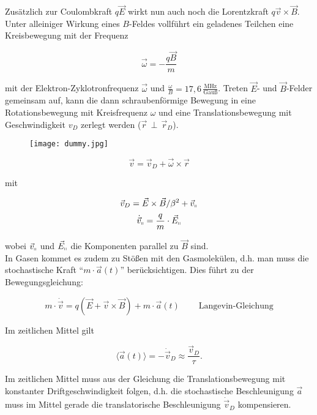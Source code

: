 Zusätzlich zur Coulombkraft $q\vec{E}$ wirkt nun auch noch die Lorentzkraft $q\vec{v}\times
\vec{B}$. Unter alleiniger Wirkung eines $B$-Feldes vollführt ein geladenes Teilchen eine
Kreisbewegung mit der Frequenz

\[\vec{\omega} = -\frac{q\vec{B}}{m}\]

mit der Elektron-Zyklotronfrequenz $\vec{\omega}$ und
$\frac{\omega}{B}=17{,}6\,\frac{\text{MHz}}{\text{Gauß}}$. Treten $\vec{E}$- und $\vec{B}$-Felder
gemeinsam auf, kann die dann schraubenförmige Bewegung in eine Rotationsbewegung mit Kreisfrequenz
$\omega$ und eine Translationsbewegung mit Geschwindigkeit $v_D$ zerlegt werden
($\vec{r}\,\perp\,\vec{r}_D$). 

\begin{figure}[H]
	\centering
	\texttt{[image: dummy.jpg]}
\end{figure}

\[ \vec{v}= \vec{v}_D + \vec{\omega}\times\vec{r} \]
 
 mit
 
 \[\vec{v}_D=\vec{E}\times \vec{B}/\beta^2 +\vec{v}_\shortparallel  \]
 \[\dot{\vec{v}}_\shortparallel = \frac{q}{m} \cdot\vec{E}_\shortparallel\]
 
 wobei $\vec{v}_\shortparallel$ und $\vec{E}_\shortparallel$ die Komponenten parallel zu $\vec{B}$
 sind.
 \\
 In Gasen kommet es zudem zu Stößen mit den Gasmolekülen, d.h. man muss die stochastische Kraft
 "`$m\cdot\vec{a}(t)$"' berücksichtigen. Dies führt zu der Bewegungsgleichung:
 
 \[m\cdot \dot{\vec{v}} = q\left( \vec{E}+\vec{v}\times\vec{B} \right) +m\cdot
 \vec{a}(t)~~~~~~~~~~\text{Langevin-Gleichung} \]

 Im zeitlichen Mittel gilt
 
 \[\langle \vec{a}(t) \rangle = - \dot{\vec{v}}_D  \approx \frac{\vec{v}_D}{\tau}. \]
 
 Im zeitlichen Mittel muss aus der Gleichung die Translationsbewegung mit konstanter
 Driftgeschwindigkeit folgen, d.h. die stochastische Beschleunigung $\vec{a}$ muss im Mittel gerade
 die translatorische Beschleunigung $\dot{\vec{v}}_D$ kompensieren.
